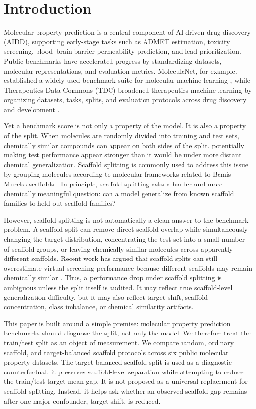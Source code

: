 \section{Introduction}

Molecular property prediction is a central component of AI-driven drug discovery (AIDD), supporting early-stage tasks such as ADMET estimation, toxicity screening, blood--brain barrier permeability prediction, and lead prioritization. Public benchmarks have accelerated progress by standardizing datasets, molecular representations, and evaluation metrics. MoleculeNet, for example, established a widely used benchmark suite for molecular machine learning \citep{wu2018moleculenet}, while Therapeutics Data Commons (TDC) broadened therapeutics machine learning by organizing datasets, tasks, splits, and evaluation protocols across drug discovery and development \citep{huang2021tdc}.

Yet a benchmark score is not only a property of the model. It is also a property of the split. When molecules are randomly divided into training and test sets, chemically similar compounds can appear on both sides of the split, potentially making test performance appear stronger than it would be under more distant chemical generalization. Scaffold splitting is commonly used to address this issue by grouping molecules according to molecular frameworks related to Bemis--Murcko scaffolds \citep{bemis1996properties}. In principle, scaffold splitting asks a harder and more chemically meaningful question: can a model generalize from known scaffold families to held-out scaffold families?

However, scaffold splitting is not automatically a clean answer to the benchmark problem. A scaffold split can remove direct scaffold overlap while simultaneously changing the target distribution, concentrating the test set into a small number of scaffold groups, or leaving chemically similar molecules across apparently different scaffolds. Recent work has argued that scaffold splits can still overestimate virtual screening performance because different scaffolds may remain chemically similar \citep{guo2024scaffold}. Thus, a performance drop under scaffold splitting is ambiguous unless the split itself is audited. It may reflect true scaffold-level generalization difficulty, but it may also reflect target shift, scaffold concentration, class imbalance, or chemical similarity artifacts.

This paper is built around a simple premise: molecular property prediction benchmarks should diagnose the split, not only the model. We therefore treat the train/test split as an object of measurement. We compare random, ordinary scaffold, and target-balanced scaffold protocols across six public molecular property datasets. The target-balanced scaffold split is used as a diagnostic counterfactual: it preserves scaffold-level separation while attempting to reduce the train/test target mean gap. It is not proposed as a universal replacement for scaffold splitting. Instead, it helps ask whether an observed scaffold gap remains after one major confounder, target shift, is reduced.

